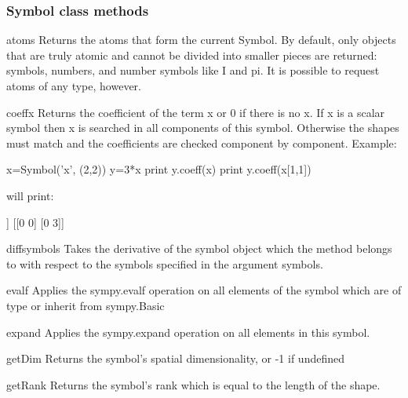 \subsubsection{Symbol class methods}
\begin{methoddesc}[Symbol]{atoms}{}
Returns the atoms that form the current Symbol.
By default, only objects that are truly atomic and cannot be divided
into smaller pieces are returned: symbols, numbers, and number
symbols like I and pi. It is possible to request atoms of any type,
however.
\end{methoddesc}

\begin{methoddesc}[Symbol]{coeff}{x }
Returns the coefficient of the term x or 0 if there is no x.
If x is a scalar symbol then x is searched in all components of
this symbol. Otherwise the shapes must match and the coefficients are
checked component by component.
Example:
\begin{python} 
x=Symbol('x', (2,2))
y=3*x
print y.coeff(x)
print y.coeff(x[1,1])
\end{python}
will print:
\begin{python}
   [[3 3]
     [3 3]]
    [[0 0]
     [0 3]]
\end{python} 
\end{methoddesc}
\begin{methoddesc}[Symbol]{diff}{symbols}
Takes the derivative of the symbol object which the method belongs to with respect to the symbols specified in the argument symbols.
\end{methoddesc}
\begin{methoddesc}[Symbol]{evalf}{}
Applies the sympy.evalf operation on all elements of the symbol which are of type or inherit from sympy.Basic 
\end{methoddesc}
\begin{methoddesc}[Symbol]{expand}{}
Applies the sympy.expand operation on all elements in this symbol.
\end{methoddesc}
\begin{methoddesc}[Symbol]{getDim}{}
Returns the symbol's spatial dimensionality, or -1 if undefined
\end{methoddesc}
\begin{methoddesc}[Symbol]{getRank}{}
Returns the symbol's rank which is equal to the length of the shape.
\end{methoddesc}
